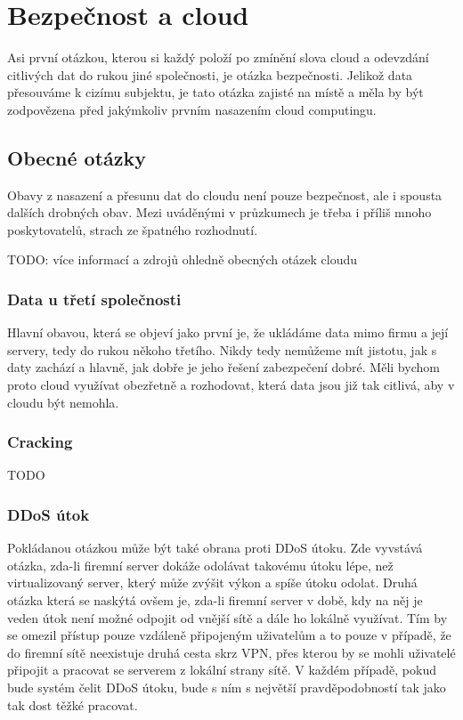 \section{Bezpečnost a cloud}
Asi první otázkou, kterou si každý položí po zmínění slova cloud a odevzdání citlivých dat do rukou jiné společnosti, je otázka bezpečnosti. Jelikož data přesouváme k cizímu subjektu, je tato otázka zajisté na místě a měla by být zodpovězena před jakýmkoliv prvním nasazením cloud computingu.

\subsection{Obecné otázky}
Obavy z nasazení a přesunu dat do cloudu není pouze bezpečnost, ale i spousta dalších drobných obav. Mezi uváděnými v průzkumech je třeba i příliš mnoho poskytovatelů, strach ze špatného rozhodnutí.\nocite{businessworld:prvniKroky}

TODO: více informací a zdrojů ohledně obecných otázek cloudu

\subsubsection{Data u třetí společnosti}
Hlavní obavou, která se objeví jako první je, že ukládáme data mimo firmu a její servery, tedy do rukou někoho třetího. Nikdy tedy nemůžeme mít jistotu, jak s daty zachází a hlavně, jak dobře je jeho řešení zabezpečení dobré. Měli bychom proto cloud využívat obezřetně a rozhodovat, která data jsou již tak citlivá, aby v cloudu být nemohla. 

\subsubsection{Cracking}
TODO

\subsubsection{DDoS útok}
Pokládanou otázkou může být také obrana proti DDoS útoku. Zde vyvstává otázka, zda-li firemní server dokáže odolávat takovému útoku lépe, než virtualizovaný server, který může zvýšit výkon a spíše útoku odolat. Druhá otázka která se naskýtá ovšem je, zda-li firemní server v době, kdy na něj je veden útok není možné odpojit od vnější sítě a dále ho lokálně využívat. Tím by se omezil přístup pouze vzdáleně připojeným uživatelům a to pouze v případě, že do firemní sítě neexistuje druhá cesta skrz VPN, přes kterou by se mohli uživatelé připojit a pracovat se serverem z lokální strany sítě.
V každém případě, pokud bude systém čelit DDoS útoku, bude s ním s největší pravděpodobností tak jako tak dost těžké pracovat.

